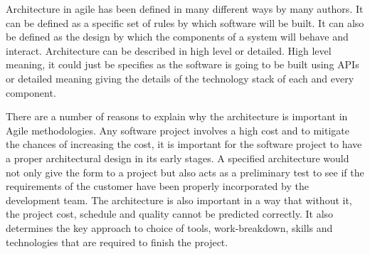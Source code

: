 Architecture in agile has been defined in many different ways by many authors. It can be defined as a specific set of rules by which software will be built. It can also be defined as the design by which the components of a system will behave and interact. Architecture can be described in high level or detailed. High level meaning, it could just be specifies as the software is going to be built using APIs or detailed meaning giving the details of the technology stack of each and every component.

There are a number of reasons to explain why the architecture is important in Agile methodologies. Any software project involves a high cost and to mitigate the chances of increasing the cost, it is important for the software project to have a proper architectural design in its early stages. A specified architecture would not only give the form to a project but also acts as a preliminary test to see if the requirements of the customer have been properly incorporated by the development team. The architecture is also important in a way that without it, the project cost, schedule and quality cannot be predicted correctly. It also determines the key approach to choice of tools, work-breakdown, skills and technologies that are required to finish the project.
